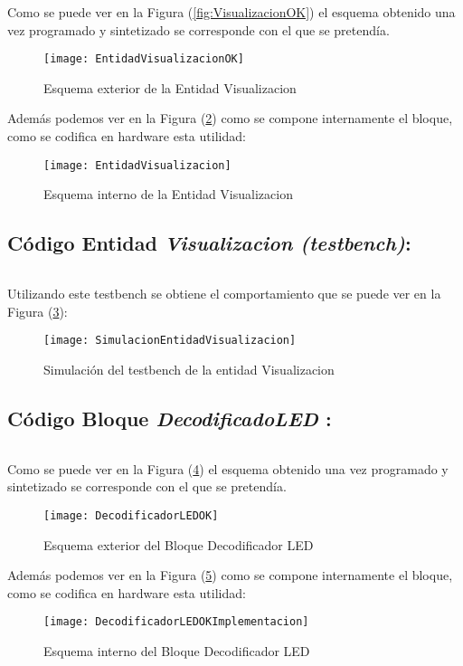 	Como se puede ver en la Figura (\ref{fig:VisualizacionOK}) el esquema obtenido una vez programado y sintetizado se corresponde con el que se pretendía.
    \begin{figure}[H]
		    \centering
		    \texttt{[image: EntidadVisualizacionOK]}
		    \caption{Esquema exterior de la Entidad Visualizacion}
		    \label{fig:EntidadVisualizacionOK}
	\end{figure}
    Además podemos ver en la Figura (\ref{fig:EntidadVisualizacionImplementacion}) como se compone internamente el bloque, como se codifica en hardware esta utilidad:
    \begin{figure}[H]
		    \centering
		    \texttt{[image: EntidadVisualizacion]}
		    \caption{Esquema interno de la Entidad Visualizacion}
		    \label{fig:EntidadVisualizacionImplementacion}
	\end{figure}

\subsection{Código Entidad \textit{Visualizacion (testbench)}:} \label{code:Visualizacion_tb}
	\inputminted[frame=lines,fontsize=\footnotesize,linenos]{vhdl}{CodeFiles/EntidadVisualizacion_tb.vhd}

    Utilizando este testbench se obtiene el comportamiento que se puede ver en la Figura (\ref{fig:SimulacionEntidadVisualizacion}):

    \begin{figure}[H]
		    \centering
		    \texttt{[image: SimulacionEntidadVisualizacion]}
		    \caption{Simulación del testbench de la entidad Visualizacion}
		    \label{fig:SimulacionEntidadVisualizacion}
	\end{figure}

\subsection {Código Bloque \textit{DecodificadoLED} :} \label{code:DecodificadorLED}
	\inputminted[frame=lines,fontsize=\footnotesize,linenos]{vhdl}{CodeFiles/DecodificadorLED.vhd}

	Como se puede ver en la Figura (\ref{fig:DecodificadorLEDOK}) el esquema obtenido una vez programado y sintetizado se corresponde con el que se pretendía.
    \begin{figure}[H]
		    \centering
		    \texttt{[image: DecodificadorLEDOK]}
		    \caption{Esquema exterior del Bloque Decodificador LED}
		    \label{fig:DecodificadorLEDOK}
	\end{figure}
    Además podemos ver en la Figura (\ref{fig:DecodificadorLEDOKImplementacion}) como se compone internamente el bloque, como se codifica en hardware esta utilidad:
    \begin{figure}[H]
		    \centering
		    \texttt{[image: DecodificadorLEDOKImplementacion]}
		    \caption{Esquema interno del Bloque Decodificador LED}
		    \label{fig:DecodificadorLEDOKImplementacion}
	\end{figure}
	
